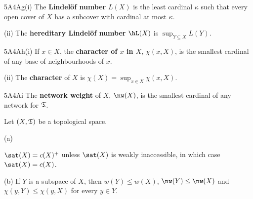 \spheader 5A4Ag(i) The {\bf Lindel\"of number} $L(X)$ is the least cardinal $\kappa$
such that every open cover of $X$ has a subcover with cardinal at most
$\kappa$.

\quad(ii) The {\bf hereditary Lindel\"of number} $\hL(X)$ is
$\sup_{Y\subseteq X}L(Y)$.

\spheader 5A4Ah(i) If $x\in X$, the {\bf character of $x$ in
$X$}, $\chi(x,X)$, is the smallest cardinal of any
base of neighbourhoods of $x$.

\quad(ii) The {\bf character} of $X$ is $\chi(X)=\sup_{x\in X}\chi(x,X)$.

\spheader 5A4Ai The {\bf network weight} of $X$, $\nw(X)$,
is the smallest cardinal of any network for $\frak T$.



 Let $(X,\frak T)$ be a topological space.

(a)






\noindent $\sat(X)=c(X)^+$ unless $\sat(X)$ is weakly inaccessible,
in which case $\sat(X)=c(X)$.

(b) If $Y$ is a subspace of $X$,
then $w(Y)\le w(X)$,
$\nw(Y)\le\nw(X)$ and
$\chi(y,Y)\le\chi(y,X)$ for every $y\in Y$.

